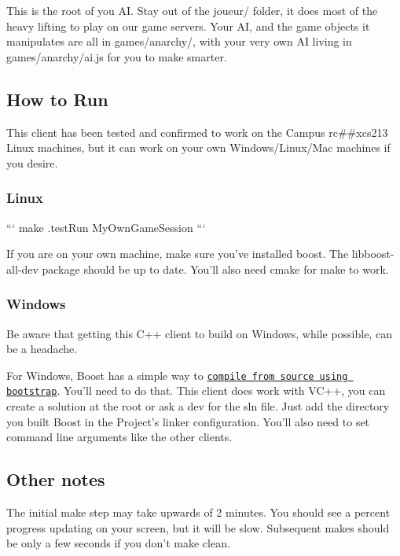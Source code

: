 This is the root of you A\-I. Stay out of the joueur/ folder, it does most of the heavy lifting to play on our game servers. Your A\-I, and the game objects it manipulates are all in {\ttfamily games/anarchy/}, with your very own A\-I living in {\ttfamily games/anarchy/ai.\-js} for you to make smarter.

\subsection*{How to Run}

This client has been tested and confirmed to work on the Campus rc\#\#xcs213 Linux machines, but it can work on your own Windows/\-Linux/\-Mac machines if you desire.

\subsubsection*{Linux}

``` make .test\-Run My\-Own\-Game\-Session ```

If you are on your own machine, make sure you've installed boost. The libboost-\/all-\/dev package should be up to date. You'll also need cmake for make to work.

\subsubsection*{Windows}

Be aware that getting this C++ client to build on Windows, while possible, can be a headache.

For Windows, Boost has a simple way to \href{http://www.boost.org/doc/libs/1_58_0/more/getting_started/windows.html}{\tt compile from source using bootstrap}. You'll need to do that. This client does work with V\-C++, you can create a solution at the root or ask a dev for the sln file. Just add the directory you built Boost in the Project's linker configuration. You'll also need to set command line arguments like the other clients.

\subsection*{Other notes}

The initial make step may take upwards of 2 minutes. You should see a percent progress updating on your screen, but it will be slow. Subsequent {\ttfamily make}s should be only a few seconds if you don't {\ttfamily make clean}. 
